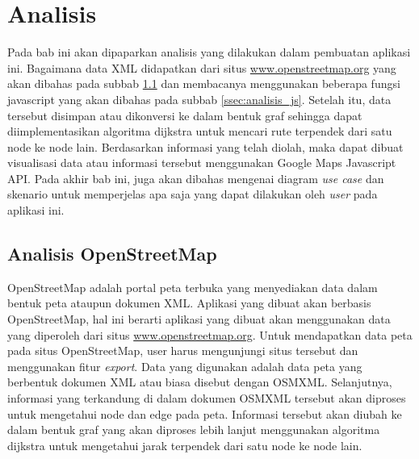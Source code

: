 \chapter{Analisis}
Pada bab ini akan dipaparkan analisis yang dilakukan dalam pembuatan aplikasi
ini. Bagaimana data XML didapatkan dari situs \url{www.openstreetmap.org}
yang akan dibahas pada subbab \ref{ssec:analisis_osm} dan membacanya
menggunakan beberapa fungsi javascript yang akan dibahas
pada subbab \ref{ssec:analisis_js}. Setelah itu, data tersebut disimpan atau
dikonversi ke dalam bentuk graf sehingga dapat diimplementasikan algoritma
dijkstra untuk mencari rute terpendek dari satu node ke node lain. Berdasarkan 
informasi yang telah diolah, maka dapat dibuat visualisasi data atau informasi
tersebut menggunakan Google Maps Javascript API. Pada akhir bab ini, juga akan 
dibahas mengenai diagram \textit{use case} dan skenario untuk
memperjelas apa saja yang dapat dilakukan oleh \textit{user} pada aplikasi ini.

\section{Analisis OpenStreetMap} \label{ssec:analisis_osm}
OpenStreetMap adalah portal peta terbuka yang menyediakan data dalam bentuk peta
ataupun dokumen XML. Aplikasi yang dibuat akan berbasis OpenStreetMap, hal ini
berarti aplikasi yang dibuat akan menggunakan data yang diperoleh dari situs
\url{www.openstreetmap.org}. Untuk mendapatkan data peta pada situs
OpenStreetMap, user harus mengunjungi situs tersebut dan menggunakan fitur
\textit{export}. Data yang digunakan adalah data peta yang berbentuk
dokumen XML atau biasa disebut dengan OSMXML. Selanjutnya, informasi yang
terkandung di dalam dokumen OSMXML tersebut akan diproses untuk mengetahui node dan edge
pada peta. Informasi tersebut akan diubah ke dalam bentuk graf yang akan
diproses lebih lanjut menggunakan algoritma dijkstra untuk mengetahui jarak
terpendek dari satu node ke node lain.

